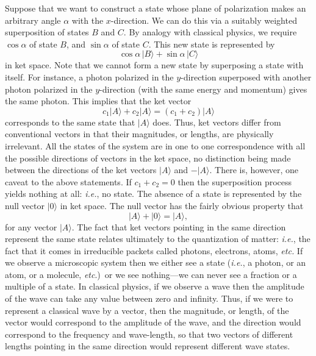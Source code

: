 Suppose that we want to construct a state whose plane of polarization makes
an arbitrary angle  $\alpha$ with  the $x$-direction. We can do this 
via a suitably weighted superposition of states $B$ and $C$. By analogy
with classical physics, we require $\cos\alpha$ of state $B$, and $\sin\alpha$
of state $C$. This new state is represented by
\begin{equation}\label{e2.3}
\cos\alpha\,|B\rangle + \sin\alpha\,|C\rangle
\end{equation}
in ket space. Note that we cannot form a new state by superposing a state
with itself. For instance, a photon polarized in the $y$-direction 
superposed with another photon polarized in the $y$-direction (with the
same energy and momentum) gives 
the same  photon. This implies
that the ket vector
\begin{equation}
c_1 |A\rangle + c_2 |A\rangle = (c_1 + c_2) |A\rangle 
\end{equation}
corresponds to the same state that $|A\rangle$ does. Thus, ket vectors differ
from conventional vectors in that  their magnitudes, or lengths, are physically
irrelevant. All the states of the system are in one to one correspondence
with all the possible directions of vectors in the ket space, no distinction
being made between the directions of the ket vectors $|A\rangle$ and $-|A\rangle$.
There is, however, one caveat to the above statements. If $c_1+c_2 = 0$ then the
superposition process yields nothing at all: {\em i.e.}, no state. The absence of
a state is represented by the null vector $|0\rangle$ in ket space. The null vector
has the fairly obvious property that
\begin{equation}
|A\rangle + |0\rangle = |A\rangle,
\end{equation}
for any vector $|A\rangle$. The fact that ket vectors pointing in the same direction
represent the same state relates ultimately to the quantization of  matter: {\em i.e.},
the fact that it comes in irreducible packets called photons, electrons, atoms,
{\em etc.}
If we observe a microscopic   system then we either see a state 
({\em i.e.}, a photon, or an atom, or a molecule, {\em  etc}.)\ or we see nothing---we can never see
a fraction or a multiple 
of a state. In classical physics, if we observe a wave then the amplitude
of the wave can take any value between zero and infinity. Thus, if we were to
 represent a classical wave by a vector, then the magnitude, or length, of the 
vector would correspond to the amplitude of the wave, and the direction
would correspond to the frequency and wave-length, 
 so that two vectors 
of different lengths pointing
in the same direction would represent different wave states. 

